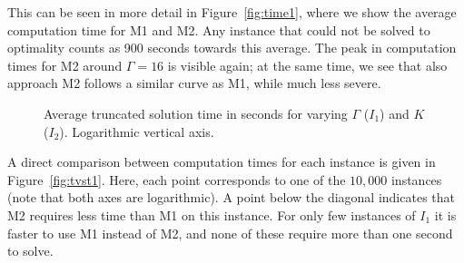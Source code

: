 This can be seen in more detail in Figure~\ref{fig:time1}, where we show the average computation time for M1 and M2. Any instance that could not be solved to optimality counts as 900 seconds towards this average.
The peak in computation times for M2 around $\Gamma=16$ is visible again; at the same time, we see that also approach M2 follows a similar curve as M1, while much less severe.

\begin{figure}[htb]
\begin{center}
%
\hfill
{}
\end{center}
\caption{Average truncated solution time in seconds for varying $\Gamma$ ($I_1$) and $K$ ($I_2$). Logarithmic vertical axis.\label{fig:time}}
\end{figure}	

A direct comparison between computation times for each instance is given in Figure~\ref{fig:tvst1}. Here, each point corresponds to one of the $10,000$ instances (note that both axes are logarithmic). A point below the diagonal indicates that M2 requires less time than M1 on this instance. For only few instances of $I_1$ it is faster to use M1 instead of M2, and none of these require more than one second to solve.

